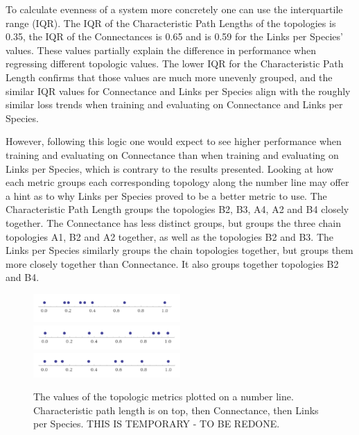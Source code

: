 \documentclass[letterpaper, 10 pt, conference]{ieeeconf}  %
\begin{document}
    To calculate evenness of a system more concretely one can use the interquartile range (IQR). The IQR of the Characteristic Path Lengths of the topologies is 0.35, the IQR of the Connectances is 0.65 and is 0.59 for the Links per Species’ values. These values partially explain the difference in performance when regressing different topologic values. The lower IQR  for the Characteristic Path Length confirms that those values are much more unevenly grouped, and the similar IQR values for Connectance and Links per Species align with the roughly similar loss trends when training and evaluating on Connectance and Links per Species. 
    
    However, following this logic one would expect to see higher performance when training and evaluating on Connectance than when training and evaluating on Links per Species, which is contrary to the results presented. Looking at how each metric groups each corresponding topology along the number line may offer a hint as to why Links per Species proved to be a better metric to use. The Characteristic Path Length groups the topologies B2, B3, A4, A2 and B4 closely together. The Connectance has less distinct groups, but groups the three chain topologies A1, B2 and A2 together, as well as the topologies B2 and B3. The Links per Species similarly groups the chain topologies together, but groups them more closely together than Connectance. It also groups together topologies B2 and B4. 
    
    \begin{figure}
    {\label{ref_label1}\includegraphics[width=0.5\textwidth]{characteristic_length_plot.png}}
    {\label{ref_label2}\includegraphics[width=0.5\textwidth]{connectance_plot.png}}
    {\label{ref_label3}\includegraphics[width=0.5\textwidth]{links_plot.png}}
    \caption{\label{ref_label_overall}The values of the topologic metrics plotted on a number line. Characteristic path length is on top, then Connectance, then Links per Species. THIS IS TEMPORARY - TO BE REDONE. }
\end{figure} 
\end{document}

